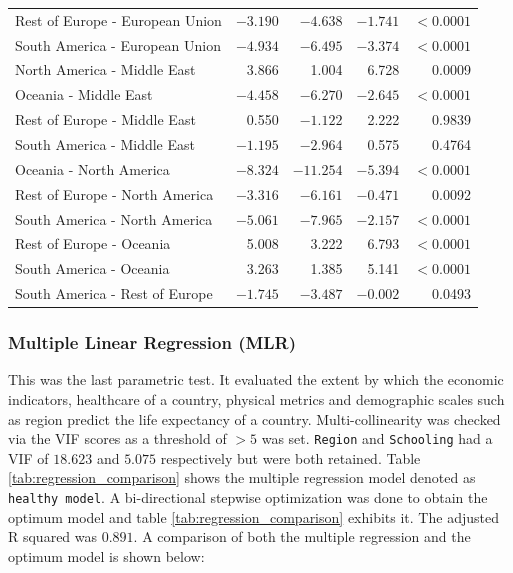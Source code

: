 \documentclass[3pt, a4paper]{article}
\begin{document}
\begin{small}
\begin{longtable}{>{\raggedright\arraybackslash}p{5.2cm}rrrr}
Rest of Europe - European Union & $-3.190$ & $-4.638$ & $-1.741$ & $< 0.0001$ \\
South America - European Union & $-4.934$ & $-6.495$ & $-3.374$ & $< 0.0001$ \\
\midrule
North America - Middle East & 3.866 & 1.004 & 6.728 & 0.0009 \\
Oceania - Middle East & $-4.458$ & $-6.270$ & $-2.645$ & $< 0.0001$ \\
Rest of Europe - Middle East & 0.550 & $-1.122$ & 2.222 & 0.9839 \\
South America - Middle East & $-1.195$ & $-2.964$ & 0.575 & 0.4764 \\
\midrule
Oceania - North America & $-8.324$ & $-11.254$ & $-5.394$ & $< 0.0001$ \\
Rest of Europe - North America & $-3.316$ & $-6.161$ & $-0.471$ & 0.0092 \\
South America - North America & $-5.061$ & $-7.965$ & $-2.157$ & $< 0.0001$ \\
\midrule
Rest of Europe - Oceania & 5.008 & 3.222 & 6.793 & $< 0.0001$ \\
South America - Oceania & 3.263 & 1.385 & 5.141 & $< 0.0001$ \\
\midrule
South America - Rest of Europe & $-1.745$ & $-3.487$ & $-0.002$ & 0.0493 \\
\end{longtable}
\end{small}

\subsubsection{Multiple Linear Regression (MLR)}
This was the last parametric test. It evaluated the extent by which the economic indicators, healthcare of a country, physical metrics and demographic scales such as region predict the life expectancy of a country. Multi-collinearity was checked via the VIF scores as a threshold of $> 5$ was set. \texttt{Region} and \texttt{Schooling} had a VIF of $18.623$ and $5.075$ respectively but were both retained. Table \ref{tab:regression_comparison} shows the multiple regression model denoted as \texttt{healthy model}. A bi-directional stepwise optimization was done to obtain the optimum model and table \ref{tab:regression_comparison} exhibits it. The adjusted R squared was $0.891$. A comparison of both the multiple regression and the optimum model is shown below:
\end{document}

